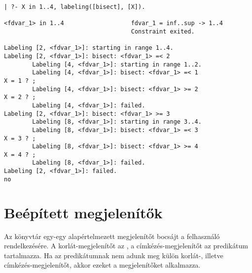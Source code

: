 \begin{verbatim}
| ?- X in 1..4, labeling([bisect], [X]).

<fdvar_1> in 1..4                   fdvar_1 = inf..sup -> 1..4
                                    Constraint exited.        

Labeling [2, <fdvar_1>]: starting in range 1..4.
Labeling [2, <fdvar_1>]: bisect: <fdvar_1> =< 2
        Labeling [4, <fdvar_1>]: starting in range 1..2.
        Labeling [4, <fdvar_1>]: bisect: <fdvar_1> =< 1     
X = 1 ? ;
        Labeling [4, <fdvar_1>]: bisect: <fdvar_1> >= 2
X = 2 ? ;
        Labeling [4, <fdvar_1>]: failed.
Labeling [2, <fdvar_1>]: bisect: <fdvar_1> >= 3
        Labeling [8, <fdvar_1>]: starting in range 3..4.
        Labeling [8, <fdvar_1>]: bisect: <fdvar_1> =< 3
X = 3 ? ;
        Labeling [8, <fdvar_1>]: bisect: <fdvar_1> >= 4
X = 4 ? ;
        Labeling [8, <fdvar_1>]: failed.
Labeling [2, <fdvar_1>]: failed.
no
\end{verbatim}

\section{Beépített megjelenítők}

Az \fdbg könyvtár egy-egy alapértelmezett megjelenítőt bocsájt a felhasználó
rendelkezésére. A korlát-megjelenítőt az , a címkézés-megjelenítőt
az  predikátum tartalmazza. Ha az  predikátumnak
nem adunk meg külön korlát-, illetve címkézés-megjelenítőt, akkor ezeket a megjelenítőket
alkalmazza.

